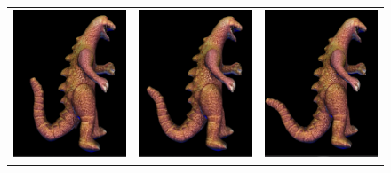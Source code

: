 \documentclass[10pt,oneside,fleqn,a4paper]{book}
\begin{document}
\begin{figure}
\begin{center}
\begin{tabular}{ccc}
\includegraphics[width=4.3cm]{../images/dino4} & \includegraphics[width=4.3cm]{../images/dino5} & \includegraphics[width=4.3cm]{../images/dino6} \\

\end{tabular}
\end{center}
\end{figure}
\end{document}
